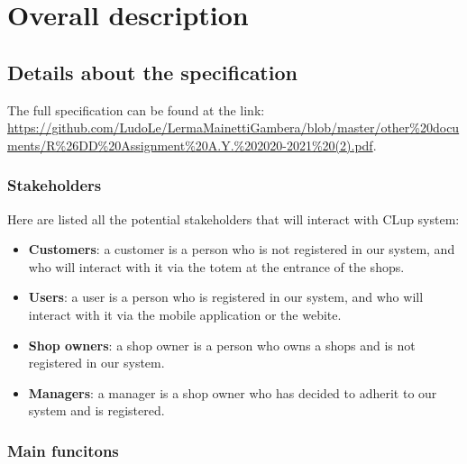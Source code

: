 \section{Overall description}
\label{sect:overalldescription}



\subsection{Details about the specification}
\label{subsect:furtherdetailsaboutspecification}

The full specification can be found at the link: \url{https://github.com/LudoLe/LermaMainettiGambera/blob/master/other%20documents/R%26DD%20Assignment%20A.Y.%202020-2021%20(2).pdf}.
\label{specification}

\subsubsection{Stakeholders}
\label{subsubsect:stakeholders}

Here are listed all the potential stakeholders that will interact with CLup system:
\begin{itemize}[topsep=0pt]
    \item \textbf{Customers}: a customer is a person who is not registered in our system, and who will interact with it via the totem at the entrance of the shops.
    \item \textbf{Users}: a user is a person who is registered in our system, and who will interact with it via the mobile application or the webite.
    \item \textbf{Shop owners}: a shop owner is a person who owns a shops and is not registered in our system.
    \item \textbf{Managers}: a manager is a shop owner who has decided to adherit to our system and is registered.
\end{itemize}

\subsubsection{Main funcitons}
\label{subsect:mainfunctions}

